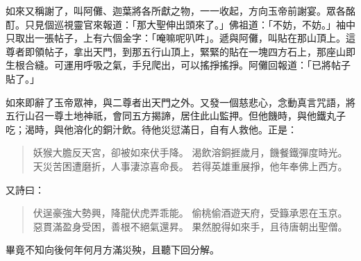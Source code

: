 如來又稱謝了，叫阿儺、迦葉將各所獻之物，一一收起，方向玉帝前謝宴。眾各酩酊。只見個巡視靈官來報道：「那大聖伸出頭來了。」佛祖道：「不妨，不妨。」袖中只取出一張帖子，上有六個金字：「唵嘛呢叭吽」。遞與阿儺，叫貼在那山頂上。這尊者即領帖子，拿出天門，到那五行山頂上，緊緊的貼在一塊四方石上，那座山即生根合縫。可運用呼吸之氣，手兒爬出，可以搖掙搖掙。阿儺回報道：「已將帖子貼了。」

如來即辭了玉帝眾神，與二尊者出天門之外。又發一個慈悲心，念動真言咒語，將五行山召一尊土地神祇，會同五方揭諦，居住此山監押。但他饑時，與他鐵丸子吃；渴時，與他溶化的銅汁飲。待他災愆滿日，自有人救他。正是：
\begin{quote}
妖猴大膽反天宮，卻被如來伏手降。
渴飲溶銅捱歲月，饑餐鐵彈度時光。
天災苦困遭磨折，人事淒涼喜命長。
若得英雄重展掙，他年奉佛上西方。
\end{quote}

又詩曰：
\begin{quote}
伏逞豪強大勢興，降龍伏虎弄乖能。
偷桃偷酒遊天府，受籙承恩在玉京。
惡貫滿盈身受困，善根不絕氣還昇。
果然脫得如來手，且待唐朝出聖僧。
\end{quote}

畢竟不知向後何年何月方滿災殃，且聽下回分解。
